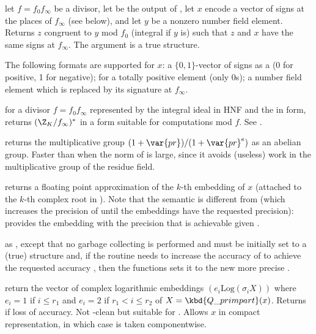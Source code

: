 let $f = f_0f_\infty$ be a divisor, let  be the output of
, let $x$ encode a vector of signs at
the places of $f_\infty$ (see below), and let $y$ be a nonzero
number field element. Returns $z$ congruent to $y$ mod $f_0$ (integral if $y$
is) such that $z$ and $x$ have the same signs at $f_\infty$. The argument
 is a true  structure.

The following formats are supported for $x$: a $\{0,1\}$-vector of signs
as a  (0 for positive, 1 for negative);  for a
totally positive element (only $0$s); a number field element which
is replaced by its signature at $f_\infty$.

 for a divisor $f =
f_0f_\infty$ represented by the integral ideal  in HNF and
the  in  form, returns $(\Z_K/f_\infty)^*$ in a form
suitable for computations mod $f$. See .

 returns the
multiplicative group $(1 + \var{pr}) / (1 + \var{pr}^e)$ as an abelian group.
Faster than  when the norm of  is large, since it
avoids (useless) work in the multiplicative group of the residue field.


 returns a floating point
approximation of the $k$-th embedding of $x$ (attached to the $k$-th
complex root in ). Note that the semantic is different from
 (which increases the precision of  until the
embeddings have the requested precision):  provides the
embedding with the precision that is achievable given .

as , except that no garbage collecting is performed and
 must be initially set to a (true)  structure and,
if the routine needs to increase the accuracy of  to achieve the
requested accuracy , then the functions sets it to the new more
precise .

 return the vector of complex
logarithmic embeddings $(e_i \text{Log}(\sigma_i X))$ where $e_i = 1$ if $i \leq
r_1$ and $e_i = 2$ if $r_1 < i \leq r_2$ of $X = \kbd{Q\_primpart}(x)$.
Returns  if loss of accuracy. Not -clean but suitable
for . Allows $x$ in compact representation, in which
case  is taken componentwise.

